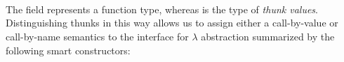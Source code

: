 \begin{code}%
%
\>[2]\AgdaSpace{}%
\AgdaSpace{}%
\AgdaSymbol{:}\AgdaSpace{}%
\AgdaSpace{}%
\<%
\\
\>[2][@{}l@{\AgdaIndent{0}}]%
\>[4]%
\>[11]\AgdaSpace{}%
\AgdaSpace{}%
%
\>[18]\AgdaSymbol{:}\AgdaSpace{}%
\<%
\\
%
\>[11]%
\>[18]\AgdaSymbol{:}\AgdaSpace{}%
\AgdaSpace{}%
\AgdaSpace{}%
\AgdaSpace{}%
\AgdaSpace{}%
\<%
\\
%
\>[11]%
\>[18]\AgdaSymbol{:}\AgdaSpace{}%
\AgdaSpace{}%
\AgdaSpace{}%
\<%
\end{code}
%
The  field represents a function type, whereas  is the type of \emph{thunk values}.
Distinguishing thunks in this way allows us to assign either a call-by-value or call-by-name semantics to the interface for $\lambda$ abstraction summarized by the following smart constructors:
%
